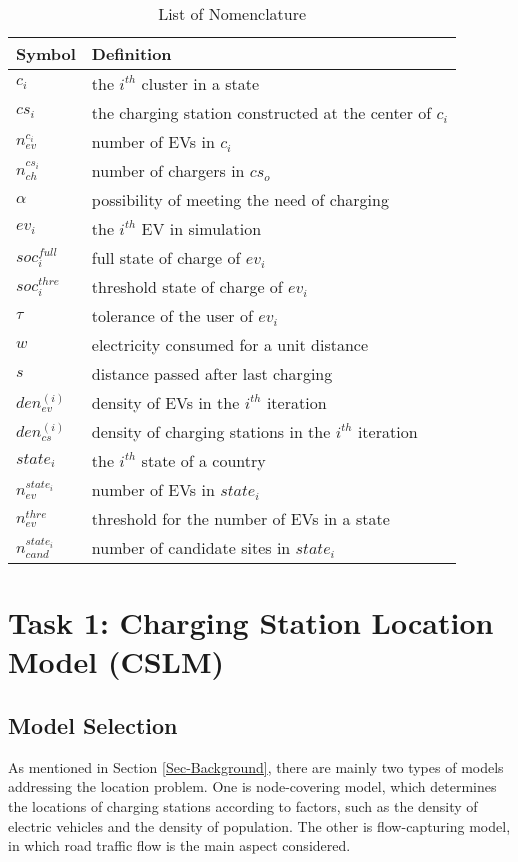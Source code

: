 \documentclass{mcmthesis}
\begin{document}
\begin{table}[htbp]
  \centering
  \caption{List of Nomenclature}\label{Tbl-Nomenclature}
  \begin{tabular}{ll}
    \toprule
    Symbol & Definition \\
    \midrule
    $c_{i}$ & the $i^{th}$ cluster in a state \\
    $cs_{i}$ & the charging station constructed at the center of $c_{i}$ \\
    $n_{ev}^{c_{i}}$ & number of EVs in $c_{i}$ \\
    $n_{ch}^{cs_{i}}$ & number of chargers in $cs_{o}$ \\
    $\alpha$ & possibility of meeting the need of charging \\
    $ev_{i}$ & the $i^{th}$ EV in simulation \\
    $soc_{i}^{full}$ & full state of charge of $ev_{i}$ \\
    $soc_{i}^{thre}$ & threshold state of charge of $ev_{i}$ \\
    $\tau$ & tolerance of the user of $ev_{i}$ \\
    $w$ & electricity consumed for a unit distance \\
    $s$ & distance passed after last charging \\
    $den_{ev}^{(i)}$ & density of EVs in the $i^{th}$ iteration \\
    $den_{cs}^{(i)}$ & density of charging stations in the $i^{th}$ iteration \\
    $state_{i}$ & the $i^{th}$ state of a country \\
    $n_{ev}^{state_{i}}$ & number of EVs in $state_{i}$ \\
    $n_{ev}^{thre}$ & threshold for the number of EVs in a state \\
    $n_{cand}^{state_{i}}$ & number of candidate sites in $state_{i}$ \\
    \bottomrule
  \end{tabular}
\end{table}
\section{Task 1: Charging Station Location Model (CSLM)}\label{Sec-Task1}
\subsection{Model Selection}
As mentioned in Section \ref{Sec-Background}, there are mainly two types of models addressing the location problem. One is node-covering model, which determines the locations of charging stations according to factors, such as the density of electric vehicles and the density of population. The other is flow-capturing model, in which road traffic flow is the main aspect considered.
\end{document}
